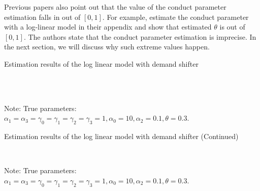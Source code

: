 \documentclass[11pt, a4paper]{article}
\begin{document}
Previous papers also point out that the value of the conduct parameter estimation falls in out of $[0,1]$.
For example, \citet{okazaki2022excess} estimate the conduct parameter with a log-linear model in their appendix and show that estimated $\theta$ is out of $[0,1]$.
The authors state that the conduct parameter estimation is imprecise.
In the next section, we will discuss why such extreme values happen.

\begin{landscape}
    \begin{table}[!htbp]
      \begin{center}
          \caption{Estimation results of the log linear model with demand shifter}
          \label{tb:loglinear_loglinear_non_constraint} 
          \subfloat[$\sigma=0.001$]{}\\
          \subfloat[$\sigma=0.5$]{}\\
      \end{center}\footnotesize
      Note: True parameters: $\alpha_1 = \alpha_3 = \gamma_0 = \gamma_1 = \gamma_2  = \gamma_3 = 1, \alpha_0 = 10, \alpha_2 = 0.1,  \theta = 0.3.$ 
    \end{table} 
\end{landscape}

\begin{landscape}
    \begin{table}[!htbp]
        \ContinuedFloat  %
            \begin{center}
                \caption{Estimation results of the log linear model with demand shifter (Continued)}
                \label{tb:loglinear_loglinear_sigma_0.001_separate_non_constraint} 
                \subfloat[$\sigma=1.0$]{}\\
                \subfloat[$\sigma=2.0$]{}
            \end{center}\footnotesize
        Note: True parameters: $\alpha_1 = \alpha_3 = \gamma_0 = \gamma_1 = \gamma_2  = \gamma_3 = 1, \alpha_0 = 10, \alpha_2 = 0.1,  \theta = 0.3.$ 
    \end{table} 
\end{landscape}
\end{document}

